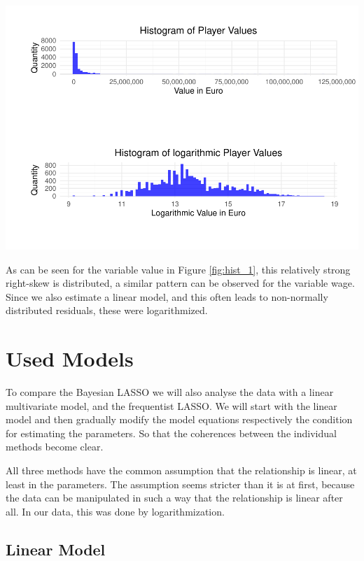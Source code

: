 \documentclass[12pt,a4paper]{article}
\let\origfigure\figure
\let\endorigfigure\endfigure
\renewenvironment{figure}[1][2] {
    \expandafter\origfigure\expandafter[H]
} {
    \endorigfigure
}
\begin{document}
\begin{figure}
\centering
\includegraphics{term_paper_bayes_files/figure-latex/fig1-1.pdf}
\caption{\label{fig:hist_1} Histograms of player values and log player
values}
\end{figure}

As can be seen for the variable value in Figure \ref{fig:hist_1}, this
relatively strong right-skew is distributed, a similar pattern can be
observed for the variable wage. Since we also estimate a linear model,
and this often leads to non-normally distributed residuals, these were
logarithmized.

\newpage

\hypertarget{used-models}{%
\section{Used Models}\label{used-models}}

To compare the Bayesian \ac{LASSO} we will also analyse the data with a
linear multivariate model, and the frequentist \ac{LASSO}. We will start
with the linear model and then gradually modify the model equations
respectively the condition for estimating the parameters. So that the
coherences between the individual methods become clear.

All three methods have the common assumption that the relationship is
linear, at least in the parameters. The assumption seems stricter than
it is at first, because the data can be manipulated in such a way that
the relationship is linear after all. In our data, this was done by
logarithmization.

\hypertarget{linear-model}{%
\subsection{Linear Model}\label{linear-model}}
\end{document}
